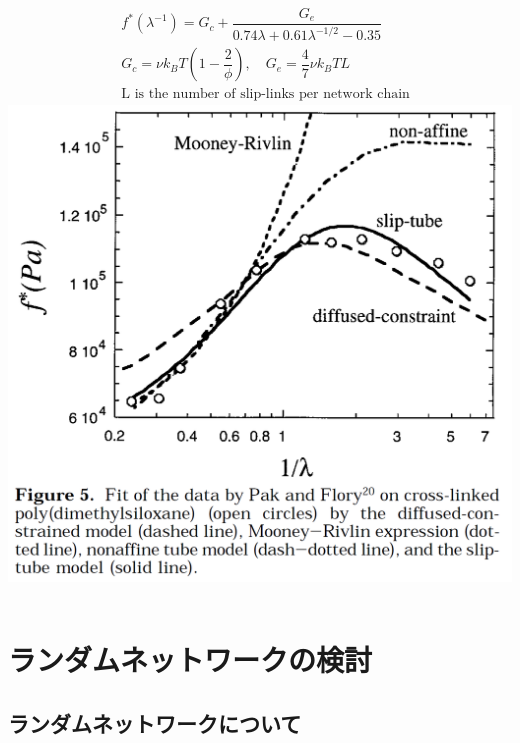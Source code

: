 \documentclass[12pt, dvipdfmx]{beamer}
\begin{document}
\begin{frame}
			\begin{columns}[totalwidth=1\textwidth]
				\scriptsize
				\begin{align*}
					&f^*(\lambda^{-1}) = G_c + \dfrac{G_e}{0.74 \lambda + 0.61 \lambda^{-1/2} - 0.35} \\
					&G_c = \nu k_B T \left(1-\dfrac{2}{\phi} \right), \quad G_e = \dfrac{4}{7} \nu k_B T L \\
					& \text{L is the number of slip-links per network chain}
				\end{align*}
				\includegraphics[width=.9\textwidth]{NW_model_rubinstein.png}
			\end{columns}
\end{frame}

\setcounter{footnote}{0}
\section{ランダムネットワークの検討}
\subsection{ランダムネットワークについて}
\end{document}
